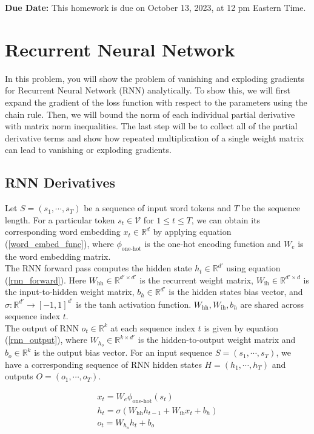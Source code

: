 \documentclass{article}
\theoremstyle{case}
\theoremstyle{definition}
\begin{document}
\textbf{Due Date:} This homework is due on October 13, 2023, at 12 pm Eastern Time.  


\section{Recurrent Neural Network}
In this problem, you will show the problem of vanishing and exploding gradients for Recurrent Neural Network (RNN) analytically. To show this, we will first expand the gradient of the loss function with respect to the parameters using the chain rule. Then, we will bound the norm of each individual partial derivative with matrix norm inequalities. The last step will be to collect all of the partial derivative terms and show how repeated multiplication of a single weight matrix can lead to vanishing or exploding gradients. 

\subsection{RNN Derivatives}

Let $S=(s_1,\cdots,s_T)$ be a sequence of input word tokens and $T$ be the sequence length. For a particular token $s_t\in \mathcal{V}$ for $1\leq t\leq T$, we can obtain its corresponding word embedding $x_t\in\mathbb{R}^{d}$ by applying equation (\ref{word_embed_func}), where $\phi_{\text{one-hot}}$ is the one-hot encoding function and $W_e$ is the word embedding matrix. \\

The RNN forward pass computes the hidden state $h_t\in\mathbb{R}^{d'}$ using equation (\ref{rnn_forward}). Here $W_{\text{hh}}\in\mathbb{R}^{d'\times d'}$ is the recurrent weight matrix,  $W_{\text{ih}}\in\mathbb{R}^{d'\times d}$ is the input-to-hidden weight matrix, $b_h\in\mathbb{R}^{d'}$ is the hidden states bias vector, and $\sigma:\mathbb{R}^{d'}\to[-1,1]^{d'}$ is the tanh activation function. $W_{\text{hh}},W_{\text{ih}},b_h$ are shared across sequence index $t$.\\

The output of RNN $o_t\in\mathbb{R}^{k}$ at each sequence index $t$ is given by equation (\ref{rnn_output}), where $W_{h_o}\in\mathbb{R}^{k\times d'}$ is the hidden-to-output weight matrix and $b_o\in\mathbb{R}^{k}$ is the output bias vector. For an input sequence $S=(s_1,\cdots,s_T)$, we have a corresponding sequence of RNN hidden states  $H=(h_1,\cdots,h_T)$ and outputs $O=(o_1,\cdots,o_T)$.

\begin{align}
    x_t=W_e\phi_{\text{one-hot}}(s_t)\label{word_embed_func}\\
    h_t=\sigma(W_{\text{hh}}h_{t-1}+W_{\text{ih}}x_t+b_h)\label{rnn_forward}\\
    o_t=W_{h_o}h_t+b_o\label{rnn_output}
\end{align}
\end{document}
